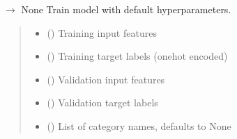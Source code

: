 \documentclass[letterpaper,10pt,english]{sphinxmanual}
\begin{document}
\begin{fulllineitems}
\label{\detokenize{autoapi/src/RandomForestTrainer/index:src.RandomForestTrainer.train}}
\pysigstartsignatures
\pysiglinewithargsret
{}
{\sphinxparamcomma {}\sphinxparamcomma {}\sphinxparamcomma {}\sphinxparamcomma {}}
{{ $\rightarrow$ None}}
\pysigstopsignatures
\sphinxAtStartPar
Train model with default hyperparameters.
\begin{quote}\begin{description}
\begin{itemize}
\item {} 
\sphinxAtStartPar
{} () \textendash{} Training input features

\item {} 
\sphinxAtStartPar
{} () \textendash{} Training target labels (one\sphinxhyphen{}hot encoded)

\item {} 
\sphinxAtStartPar
{} () \textendash{} Validation input features

\item {} 
\sphinxAtStartPar
{} () \textendash{} Validation target labels

\item {} 
\sphinxAtStartPar
{} (\sphinxstyleliteralemphasis{\sphinxupquote{{[}}}\sphinxstyleliteralemphasis{\sphinxupquote{{]}}}\sphinxstyleliteralemphasis{\sphinxupquote{, }}) \textendash{} List of category names, defaults to None

\end{itemize}

\end{description}\end{quote}

\end{fulllineitems}
\end{document}

